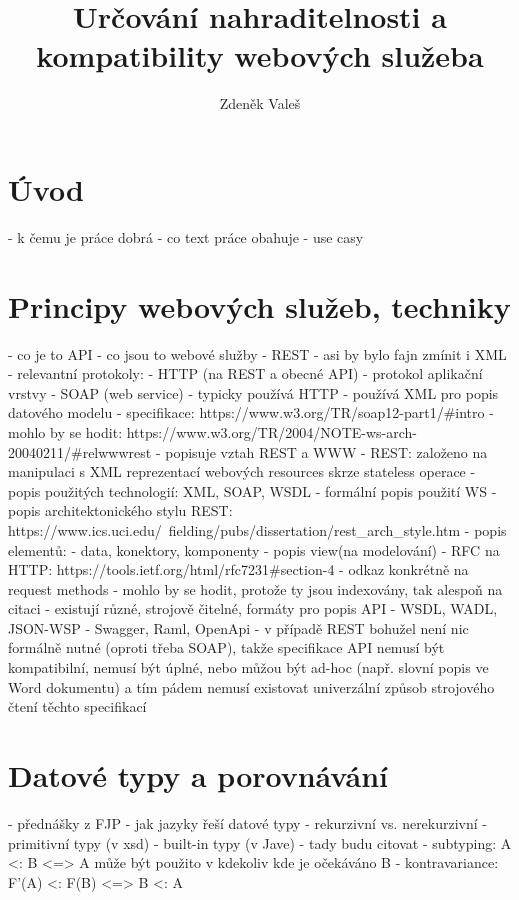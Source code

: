 \documentclass[czech,DP]{thesiskiv}
\author{Zdeněk Valeš}
\title{Určování nahraditelnosti a\\kompatibility webových služeba}
\begin{document}
%
\maketitle
\tableofcontents

\chapter{Úvod}

- k čemu je práce dobrá
- co text práce obahuje
- use casy

\chapter{Principy webových služeb, techniky}

 - co je to API
 - co jsou to webové služby
 - REST
 - asi by bylo fajn zmínit i XML
 - relevantní protokoly:
 	- HTTP (na REST a obecné API)
 		- protokol aplikační vrstvy
 	- SOAP (web service)
 		- typicky používá HTTP
 		- používá XML pro popis datového modelu
 		- specifikace: https://www.w3.org/TR/soap12-part1/\#intro
 - mohlo by se hodit: https://www.w3.org/TR/2004/NOTE-ws-arch-20040211/\#relwwwrest
 	- popisuje vztah REST a WWW
 			 - REST: založeno na manipulaci s XML reprezentací webových resources skrze stateless operace
 	- popis použitých technologií: XML, SOAP, WSDL
 	- formální popis použití WS
 - popis architektonického stylu REST: https://www.ics.uci.edu/~fielding/pubs/dissertation/rest\_arch\_style.htm
 	- popis elementů:
 		- data, konektory, komponenty
 	- popis view(na modelování)
 - RFC na HTTP: https://tools.ietf.org/html/rfc7231\#section-4
 	- odkaz konkrétně na request methods
 	- mohlo by se hodit, protože ty jsou indexovány, tak alespoň na citaci
 - existují různé, strojově čitelné, formáty pro popis API
 	- WSDL, WADL, JSON-WSP
 	- Swagger, Raml, OpenApi
 	- v případě REST bohužel není nic formálně nutné (oproti třeba SOAP), takže specifikace API nemusí být kompatibilní, nemusí být úplné, nebo můžou být ad-hoc (např. slovní popis ve Word dokumentu) a tím pádem nemusí existovat univerzální způsob strojového čtení těchto specifikací
 
\chapter{Datové typy a porovnávání}

- přednášky z FJP
- jak jazyky řeší datové typy
	- rekurzivní vs. nerekurzivní
- primitivní typy (v xsd)
- built-in typy (v Jave)
- tady budu citovat \cite{abadi1995subytping}
	- subtyping: A <: B <=> A může být použito v kdekoliv kde je očekáváno B
	- kontravariance: F'(A) <: F(B) <=> B <: A
\end{document}
